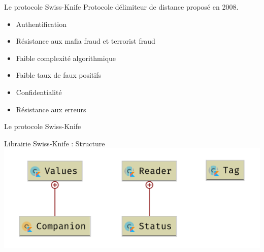 \documentclass[aspectratio=169]{beamer}
\begin{document}
\begin{frame}{Le protocole Swiss-Knife}
  Protocole délimiteur de distance proposé en 2008. \cite{SwissKnife}

  \bigskip

  \begin{itemize}
    \item Authentification
    \item Résistance aux mafia fraud et terrorist fraud
    \item Faible complexité algorithmique
    \item Faible taux de faux positifs
    \item Confidentialité
    \item Résistance aux erreurs
  \end{itemize}
\end{frame}

\begin{frame}{Le protocole Swiss-Knife}

  \centering

\end{frame}

\begin{frame}{Librairie Swiss-Knife : Structure}
  \centering
  \includegraphics[width=.8\linewidth]{../assets/uml_jar.png}
\end{frame}
\end{document}
